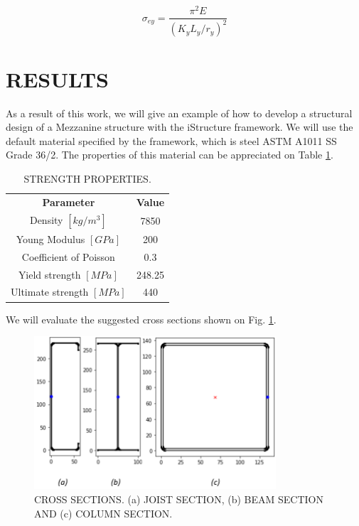 \documentclass[twocolumn,10pt]{asme2e}
\begin{document}
\begin{equation}
\sigma _{ey} = \frac{\pi ^2 E}{(K_y L_y / r_y)^2}
\label{sigma_ey}
\end{equation}



\section*{RESULTS}

As a result of this work, we will give an example of how to develop a structural design of a Mezzanine structure with the iStructure framework. We will use the default material specified by the framework, which is steel ASTM A1011 SS Grade 36/2. The properties of this material can be appreciated on Table \ref{steel}.

\begin{table}[t]
\centering
\caption{STRENGTH PROPERTIES.}
\begin{tabular}{c c}
 & \\
\hline
\textbf{Parameter} & \textbf{Value} \\ \hline
Density $\left[kg/m^3\right]$ & 7850 \\ \hline
Young Modulus $[GPa]$ & 200 \\ \hline
Coefficient of Poisson & 0.3 \\ \hline
Yield strength $[MPa]$ & 248.25 \\ \hline
Ultimate strength $[MPa]$ & 440 \\ \hline
\end{tabular}
\label{steel}
\end{table}

We will evaluate the suggested cross sections shown on Fig. \ref{sections}.

\begin{figure}[t]
\centering
\includegraphics[width=9cm]{Images/sections.PNG}
\caption{CROSS SECTIONS. (a) JOIST SECTION, (b) BEAM SECTION AND (c) COLUMN SECTION.}
\label{sections}
\end{figure}
\end{document}
